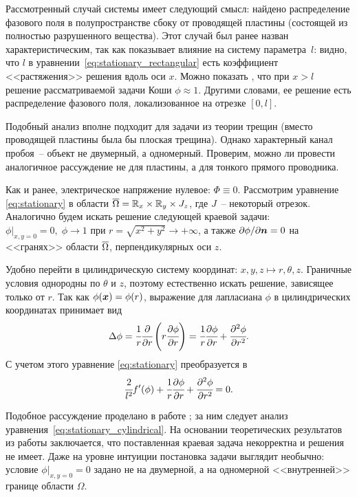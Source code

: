 Рассмотренный случай системы имеет следующий смысл: найдено распределение фазового поля в полупространстве сбоку от проводящей пластины (состоящей из полностью разрушенного вещества). Этот случай был ранее назван характеристическим, так как показывает влияние на систему параметра~$l$: видно, что $l$ в уравнении~\eqref{eq:stationary_rectangular} есть коэффициент <<растяжения>> решения вдоль оси $x$. Можно показать \cite{zipunova_higher_codimension}, что при $x > l$ решение рассматриваемой задачи Коши $\phi \approx 1$. Другими словами, ее решение есть распределение фазового поля, локализованное на отрезке $[0, l]$.

Подобный анализ вполне подходит для задачи из теории трещин (вместо проводящей пластины была бы плоская трещина). Однако характерный канал пробоя~-- объект не двумерный, а одномерный. Проверим, можно ли провести аналогичное рассуждение не для пластины, а для тонкого прямого проводника.

Как и ранее, электрическое напряжение нулевое: $\Phi \equiv 0$. Рассмотрим уравнение \eqref{eq:stationary} в области ${\overline{\Omega}} = {\mathbb{R}}_x \times {\mathbb{R}}_y \times J_z$, где $J$~-- некоторый отрезок. Аналогично будем искать решение следующей краевой задачи: $\phi|_{x, y = 0} = 0, \; \phi \to 1$ при $r = \sqrt{x^2 + y^2} \to +\infty$, а также $\partial \phi / \partial {\boldsymbol{n}} = 0$ на <<гранях>> области ${\overline{\Omega}}$, перпендикулярных оси $z$.

Удобно перейти в цилиндрическую систему координат: $x, y, z \mapsto r, \theta, z$. Граничные условия однородны по $\theta$ и $z$, поэтому естественно искать решение, зависящее только от $r$. Так как $\phi({\boldsymbol{x}}) = \phi(r)$, выражение для лапласиана $\phi$ в цилиндрических координатах принимает вид
$$\Delta \phi = \cfrac{1}{r} \cfrac{\partial }{\partial r} \left( r \cfrac{\partial \phi}{\partial r} \right) = \cfrac{1}{r} \cfrac{\partial \phi}{\partial r} + \cfrac{\partial^2 \phi}{\partial {r}^2} {\text{.}}$$
С учетом этого уравнение \eqref{eq:stationary} преобразуется в
\begin{equation}
	\cfrac{2}{l^2} f'(\phi) + \cfrac{1}{r} \cfrac{\partial \phi}{\partial r} + \cfrac{\partial^2 \phi}{\partial {r}^2} = 0 {\text{.}}
	\label{eq:stationary_cylindrical}
\end{equation}

Подобное рассуждение проделано в работе \cite{zipunova_higher_codimension}; за ним следует анализ уравнения~\eqref{eq:stationary_cylindrical}. На основании теоретических результатов из работы \cite{cirstea_elliptic_equations} заключается, что поставленная краевая задача некорректна и решения не имеет. Даже на уровне интуиции постановка задачи выглядит необычно: условие $\phi|_{x, y = 0} = 0$ задано не на двумерной, а на одномерной <<внутренней>> границе области $\Omega$.

